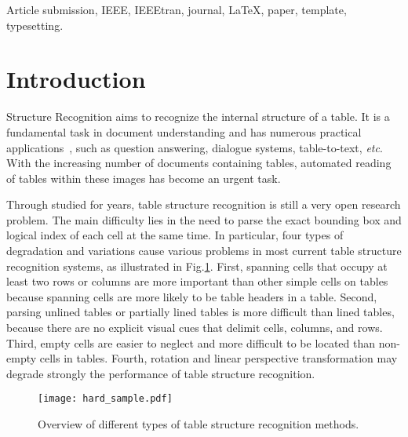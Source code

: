 \documentclass[lettersize,journal]{IEEEtran}
\begin{document}
\begin{IEEEkeywords}
Article submission, IEEE, IEEEtran, journal, \LaTeX, paper, template, typesetting.
\end{IEEEkeywords}

\section{Introduction}
 Structure Recognition aims to recognize the internal structure of a table. It is a fundamental task in document understanding and has numerous practical applications~\cite{zanibbi2004survey}, such as question answering, dialogue systems, table-to-text, \emph{etc}. With the increasing number of documents containing tables, automated reading of tables within these images has become an urgent task.

Through studied for years, table structure recognition is still a very open research problem. The main difficulty lies in the need to parse the exact bounding box and logical index of each cell at the same time. In particular, four types of degradation and variations cause various problems in most current table structure recognition systems, as illustrated in Fig.\ref{fig:hard_sample}. First, spanning cells that occupy at least two rows or columns are more important than other simple cells on tables because spanning cells are more likely to be table headers in a table\cite{chi2019complicated}. Second, parsing unlined tables or partially lined tables is more difficult than lined tables, because there are no explicit visual cues that delimit cells, columns, and rows. Third, empty cells are easier to neglect and more difficult to be located than non-empty cells in tables. Fourth, rotation and linear perspective transformation may degrade strongly the performance of table structure recognition.

\begin{figure}[t]
\begin{center}
\texttt{[image: hard\_sample.pdf]}
\end{center}
\caption{Overview of different types of table structure recognition methods.}
\label{fig:hard_sample}
\end{figure} 
\end{document}

